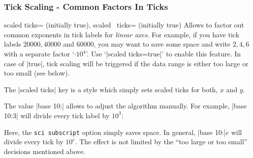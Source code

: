 \subsubsection{Tick Scaling - Common Factors In Ticks}
\label{sec:scaled:ticks}%
\begin{pgfplotsxykeylist}{
	scaled ticks= (initially true),%
	scaled \x\ ticks= (initially true)%
}
Allows to factor out common exponents in tick labels for \emph{linear axes}. For example, if you have tick labels $20000,40000$ and $60000$, you may want to save some space and write $2,4,6$ with a separate factor `$\cdot 10^4$'. Use `|scaled ticks=true|' to enable this feature. In case of |true|, tick scaling will be triggered if the data range is either too large or too small (see below).
\begin{codeexample}[]
%
\end{codeexample}

\begin{codeexample}[]
\end{codeexample}

	The |scaled ticks| key is a style which simply sets scaled ticks for both, $x$ and $y$.

	The value |base 10:| allows to adjust the algorithm manually. For example, |base 10:3| will divide every tick label by $10^3$:
\begin{codeexample}[]
\end{codeexample}
\noindent Here, the \texttt{sci subscript} option simply saves space.
In general, |base 10:|$e$ will divide every tick by $10^e$. The effect
is not limited by the ``too large or too small'' decisions mentioned
above.


\end{pgfplotsxykeylist}
